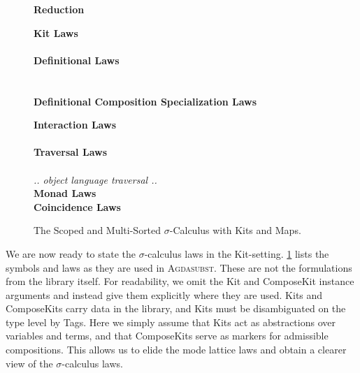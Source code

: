 \documentclass[screen,nonacm]{acmart}
\begin{document}
\begin{figure}[t]
      {\raggedright \vspace{2.0em} \textbf{\Large Reduction} \par}
      \vspace{1.5em}
      \begin{minipage}[t]{0.40\textwidth}
            \raggedright
            \textbf{Kit Laws}\\
            \ETypeLevel{}\\
            \vspace{0.5em}
            \textbf{Definitional Laws}\\
            \vspace{0.5em}
            \EDefLawTy{}\\
            \vspace{0.5em}
            \EDefLaw{}\\
            \vspace{0.5em}
            \textbf{Definitional Composition Specialization Laws}
            \ESpecialDefLaws{}
      \end{minipage}
      \hfill
      \begin{minipage}[t]{0.54\textwidth}
            \raggedright
            \textbf{Interaction Laws}\\
            \EInteraction{}\\
            \vspace{0.5em}
            \textbf{Traversal Laws}\\
            \ETravL{}\\
            \emph{.. object language traversal ..}\\
            \vspace{0.5em}
            \textbf{Monad Laws}\\
            \EMonad{}
            \vspace{0.5em}
            \textbf{Coincidence Laws}\\
            \ECoincidence{}
      \end{minipage}
      \caption{The Scoped and Multi-Sorted $\sigma$-Calculus with Kits and Maps.}
      \label{fig:ags:fin}
\end{figure}

We are now ready to state the $\sigma$-calculus laws in the Kit-setting.
\cref{fig:ags:fin} lists the symbols and laws as they are used in
\textsc{Agdasubst}. These are not the formulations from the library itself. For
readability, we omit the Kit and ComposeKit instance arguments and instead give
them explicitly where they are used. Kits and ComposeKits carry data in the
library, and Kits must be disambiguated on the type level by Tags. Here we
simply assume that Kits act as abstractions over variables and terms, and that
ComposeKits serve as markers for admissible compositions. This allows us to
elide the mode lattice laws and obtain a clearer view of the $\sigma$-calculus
laws.
\end{document}

